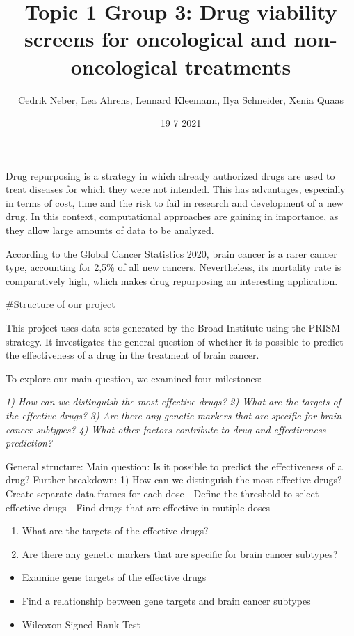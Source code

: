 \documentclass[
]{article}
\title{Topic 1 Group 3: Drug viability screens for oncological and
non-oncological treatments}
\author{Cedrik Neber, Lea Ahrens, Lennard Kleemann, Ilya Schneider, Xenia Quaas}
\date{19 7 2021}
\providecommand{\tightlist}{%
  \setlength{\itemsep}{0pt}\setlength{\parskip}{0pt}}
\begin{document}
\maketitle

Drug repurposing is a strategy in which already authorized drugs are
used to treat diseases for which they were not intended. This has
advantages, especially in terms of cost, time and the risk to fail in
research and development of a new drug. In this context, computational
approaches are gaining in importance, as they allow large amounts of
data to be analyzed.

According to the Global Cancer Statistics 2020, brain cancer is a rarer
cancer type, accounting for 2,5\% of all new cancers. Nevertheless, its
mortality rate is comparatively high, which makes drug repurposing an
interesting application.

\#Structure of our project

This project uses data sets generated by the Broad Institute using the
PRISM strategy. It investigates the general question of whether it is
possible to predict the effectiveness of a drug in the treatment of
brain cancer.

To explore our main question, we examined four milestones:

\emph{1) How can we distinguish the most effective drugs?} \emph{2) What
are the targets of the effective drugs?} \emph{3) Are there any genetic
markers that are specific for brain cancer subtypes?} \emph{4) What
other factors contribute to drug and effectiveness prediction? }

General structure: Main question: Is it possible to predict the
effectiveness of a drug? Further breakdown: 1) How can we distinguish
the most effective drugs? - Create separate data frames for each dose -
Define the threshold to select effective drugs - Find drugs that are
effective in mutiple doses

\begin{enumerate}
\def\labelenumi{\arabic{enumi})}
\setcounter{enumi}{1}
\tightlist
\item
  What are the targets of the effective drugs?
\item
  Are there any genetic markers that are specific for brain cancer
  subtypes?
\end{enumerate}

\begin{itemize}
\tightlist
\item
  Examine gene targets of the effective drugs
\item
  Find a relationship between gene targets and brain cancer subtypes
\item
  Wilcoxon Signed Rank Test
\end{itemize}
\end{document}
